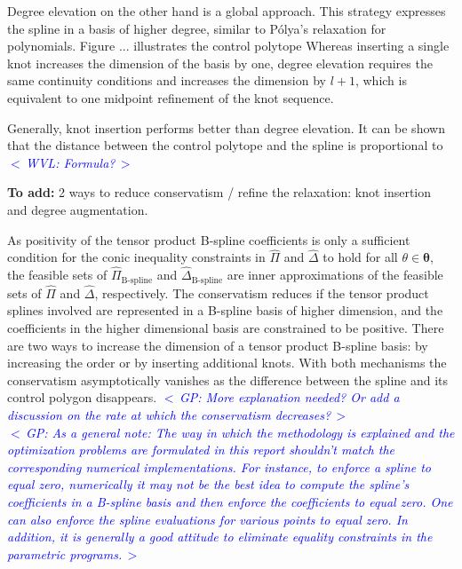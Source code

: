 \documentclass{article}
\newcommand{\commentGP}[1]{\noindent \textcolor{blue}{\emph{$<\,$GP: #1$\,>$}}}%
\newcommand{\commentWVL}[1]{\noindent \textcolor{blue}{\emph{$<\,$WVL: #1$\,>$}}}%
\newcommand{\ppar}{\theta}                          %
\newcommand{\Ppar}{{\bm{\theta}}}                   %
\begin{document}
Degree elevation on the other hand is a global approach. This strategy
expresses the spline in a basis of higher degree, similar to P\'olya's
relaxation for polynomials. Figure ... illustrates the control polytope  Whereas inserting a single
knot increases the dimension of the basis by one, degree elevation requires the
same continuity conditions and increases the dimension by $l+1$, which is
equivalent to one midpoint refinement of the knot sequence.

Generally, knot insertion performs better than degree elevation. It can be
shown that the distance between the control polytope and the spline is
proportional to~\cite{deBoor_2001} \commentWVL{Formula?}

\noindent \textbf{To add:} 2 ways to reduce conservatism / refine the relaxation: knot insertion and degree augmentation.

As positivity of the tensor product B-spline coefficients is only a sufficient condition for the conic inequality constraints in $\hat{\Pi}$ and $\hat{\Delta}$ to hold for all $\ppar\in\Ppar$, the feasible sets of $\hat{\Pi}_{\text{B-spline}}$ and $\hat{\Delta}_{\text{B-spline}}$ are inner approximations of the feasible sets of $\hat{\Pi}$ and $\hat{\Delta}$, respectively. The conservatism reduces if the tensor product splines involved are represented in a B-spline basis of higher dimension, and the coefficients in the higher dimensional basis are constrained to be positive. There are two ways to increase the dimension of a tensor product B-spline basis: by increasing the order or by inserting additional knots. With both mechanisms the conservatism asymptotically vanishes as the difference between the spline and its control polygon disappears. \commentGP{More explanation needed? Or add a discussion on the rate at which the conservatism decreases?}\\

\commentGP{As a general note: The way in which the methodology is explained and the optimization problems are formulated in this report shouldn't match the corresponding numerical implementations. For instance, to enforce a spline to equal zero, numerically it may not be the best idea to compute the spline's coefficients in a B-spline basis and then enforce the coefficients to equal zero. One can also enforce the spline evaluations for various points to equal zero. In addition, it is generally a good attitude to eliminate equality constraints in the parametric programs.}


\end{document}
